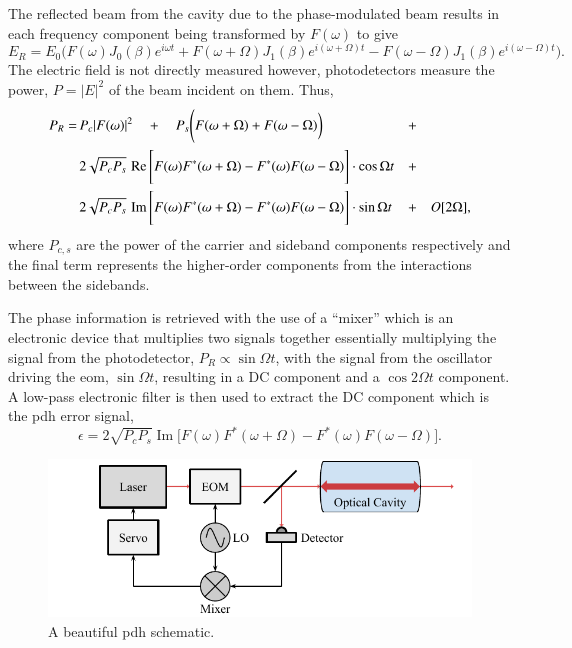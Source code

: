 The reflected beam from the cavity due to the phase-modulated beam results in each frequency component being transformed by $F(\omega)$ to give
\begin{equation}
E_R = E_0 \Bigg(F(\omega)J_0(\beta)e^{i\omega t} + F(\omega+\Omega)J_1(\beta)e^{i(\omega+\Omega) t} - F(\omega-\Omega)J_1(\beta)e^{i(\omega-\Omega) t} \Bigg).
\end{equation}
The electric field is not directly measured however, photodetectors measure the power, $P=|E|^2$ of the beam incident on them.
Thus,
\begin{align}
P_R = \,&P_c|F(\omega)|^2 \quad+\quad P_s \Bigg( F(\omega+\Omega) + F(\omega-\Omega)\bigg) &+\quad&\notag\\
& 2\sqrt{P_cP_s} \, \operatorname{Re}\Bigg[ F(\omega)F^*(\omega+\Omega)-F^*(\omega)F(\omega-\Omega)\Bigg]\cdot\cos\Omega t &+\quad& \notag\\
& 2\sqrt{P_cP_s} \, \operatorname{Im}\Bigg[ F(\omega)F^*(\omega+\Omega)-F^*(\omega)F(\omega-\Omega)\Bigg]\cdot\sin\Omega t &+ \quad&O[2\Omega],
\end{align}
where $P_{c,s}$ are the power of the carrier and sideband components respectively and the final term represents the higher-order components from the interactions between the sidebands.

The phase information is retrieved with the use of a ``mixer'' which is an electronic device that multiplies two signals together essentially multiplying the signal from the photodetector, $P_R \propto \sin\Omega t$, with the signal from the oscillator driving the \gls{eom}, $\sin\Omega t$, resulting in a DC component and a $\cos2\Omega t$ component.
A low-pass electronic filter is then used to extract the DC component which is the \gls{pdh} error signal,
\begin{equation}
\epsilon = 2\sqrt{P_cP_s}\operatorname{Im}\Bigg[F(\omega)F^*(\omega+\Omega) - F^*(\omega)F(\omega-\Omega)\Bigg].
\end{equation}


\begin{figure}
\centering
\includegraphics{part1/Figs/PDH.pdf}
\caption{A beautiful \gls{pdh} schematic.}
\end{figure}



